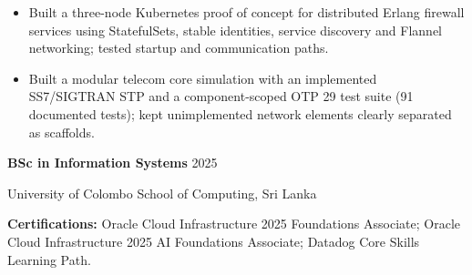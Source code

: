 \begin{itemize}
\item Built a three-node Kubernetes proof of concept for distributed Erlang firewall services using StatefulSets, stable identities, service discovery and Flannel networking; tested startup and communication paths.
\end{itemize}

\begin{itemize}
\item Built a modular telecom core simulation with an implemented SS7/SIGTRAN STP and a component-scoped OTP 29 test suite (91 documented tests); kept unimplemented network elements clearly separated as scaffolds.
\end{itemize}

\textbf{BSc in Information Systems} \hfill 2025\par
University of Colombo School of Computing, Sri Lanka\par
\vspace{3pt}
\textbf{Certifications:} Oracle Cloud Infrastructure 2025 Foundations Associate; Oracle Cloud Infrastructure 2025 AI Foundations Associate; Datadog Core Skills Learning Path.
